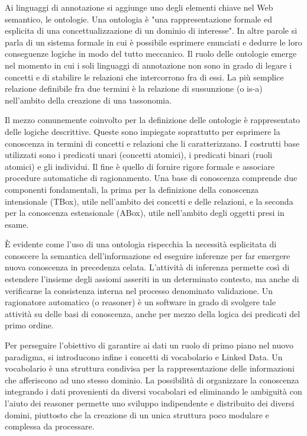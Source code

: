 \documentclass[Lau,binding=0.6cm,noexaminfo,oneside]{sapthesis}
\begin{document}
Ai linguaggi di annotazione si aggiunge uno degli elementi chiave nel Web semantico, le ontologie. Una ontologia è "una rappresentazione formale ed esplicita di una concettualizzazione di un dominio di interesse". In altre parole si parla di un sistema formale in cui è possibile esprimere enunciati e dedurre le loro conseguenze logiche in modo del tutto meccanico.
Il ruolo delle ontologie emerge nel momento in cui i soli linguaggi di annotazione non sono in grado di legare i concetti e di stabilire le relazioni che intercorrono fra di essi. La più semplice relazione definibile fra due termini è la relazione di sussunzione (o is-a) nell'ambito della creazione di una tassonomia.\medskip

Il mezzo comunemente coinvolto per la definizione delle ontologie è rappresentato delle logiche descrittive. Queste sono impiegate soprattutto per esprimere la conoscenza in termini di concetti e relazioni che li caratterizzano. I costrutti base utilizzati sono i predicati unari (concetti atomici), i predicati binari (ruoli atomici) e gli individui.
Il fine è quello di fornire rigore formale e associare procedure automatiche di ragionamento. Una base di conoscenza comprende due componenti fondamentali, la prima per la definizione della conoscenza intensionale (TBox), utile nell'ambito dei concetti e delle relazioni, e la seconda per la conoscenza estensionale (ABox), utile nell'ambito degli oggetti presi in esame.\medskip

\MakeUppercase{è} evidente come l'uso di una ontologia rispecchia la necessità esplicitata di conoscere la semantica dell'informazione ed eseguire inferenze per far emergere nuova conoscenza in precedenza celata.
L'attività di inferenza permette così di estendere l'insieme degli assiomi asseriti in un determinato contesto, ma anche di verificarne la consistenza interna nel processo denominato validazione. Un ragionatore automatico (o reasoner) è un software in grado di svolgere tale attività su delle basi di conoscenza, anche per mezzo della logica dei predicati del primo ordine.\medskip

Per perseguire l'obiettivo di garantire ai dati un ruolo di primo piano nel nuovo paradigma, si introducono infine i concetti di vocabolario e Linked Data. Un vocabolario è una struttura condivisa per la rappresentazione delle informazioni che afferiscono ad uno stesso dominio.
La possibilità di organizzare la conoscenza integrando i dati provenienti da diversi vocabolari ed eliminando le ambiguità con l'aiuto dei reasoner permette uno sviluppo indipendente e distribuito dei diversi domini, piuttosto che la creazione di un unica struttura poco modulare e complessa da processare.\medskip
\end{document}
